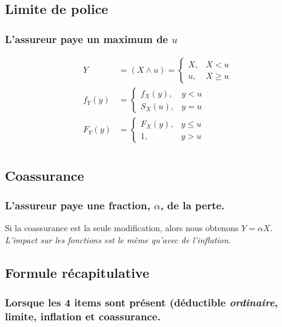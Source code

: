 \documentclass[french, landscape]{article}
\begin{document}
\begin{multicols*}{3}
\subsection*{Limite de police}
\subsubsection*{L'assureur paye un maximum de $u$}

\begin{align*}
Y 	&= (X \wedge u)
	= 
	\left\{
		\begin{array}{ll}
			X, & X < u \\
			u, & X \geq u
		\end{array}
	\right. \\
f_Y(y) &=
		\left\{
			\begin{array}{ll}
				f_X(y), & y < u \\
				S_X(u), & y = u
			\end{array}
		\right. \\
F_Y(y) &=
		\left\{
			\begin{array}{ll}
				F_X(y), & y \leq u \\
				1, & y > u
			\end{array}
		\right. \\
\end{align*}

\subsection*{Coassurance}
\subsubsection*{L'assureur paye une fraction, $\alpha$, de la perte.}

Si la coassurance est la seule modification, alors nous obtenons $Y = \alpha X$. \\
\textit{L'impact sur les fonctions est le même qu'avec de l'inflation}.

\subsection*{Formule récapitulative}
\subsubsection*{Lorsque les 4 items sont présent (déductible \textit{ordinaire}, limite, inflation et coassurance.}


\end{multicols*}
\end{document}
